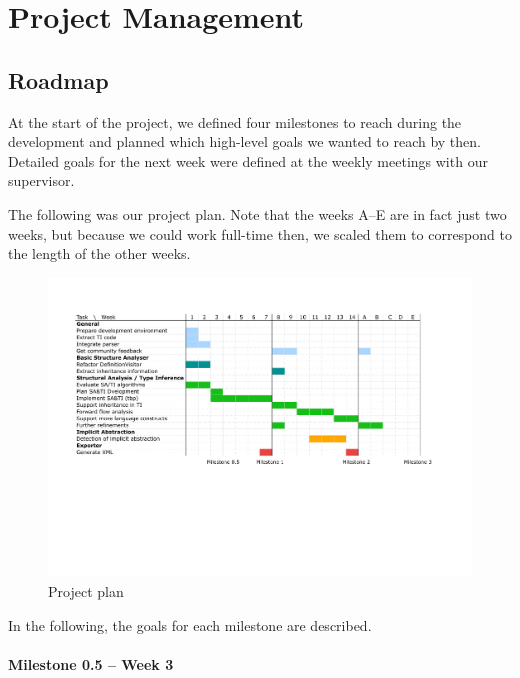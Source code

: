 \documentclass[12pt,halfparskip,DIV11,BCOR10mm]{scrreprt}
\begin{document}
\chapter{Project Management}


\section{Roadmap}

At the start of the project, we defined four milestones to reach during the development and planned which high-level goals we wanted to reach by then. Detailed goals for the next week were defined at the weekly meetings with our supervisor.

The following was our project plan. Note that the weeks A--E are in fact just two weeks, but because we could work full-time then, we scaled them to correspond to the length of the other weeks.

\begin{figure}[H]
 \centering
 \includegraphics[width=\textwidth, trim=50 220 80 50, clip=true]{project/project-plan-v2}
 \caption{Project plan}
 \label{fig:project_plan}
\end{figure}

In the following, the goals for each milestone are described.

\subsubsection{Milestone 0.5 – Week 3}
\end{document}
